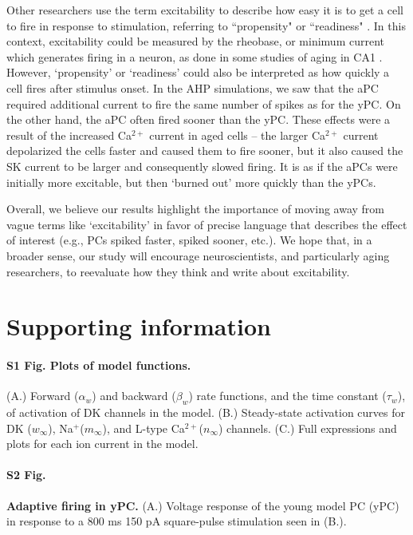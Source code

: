 \documentclass[10pt,letterpaper]{article}
\newcommand{\Ca}{Ca$^{2+}$}
\newcommand{\Na}{Na$^{+}$}
\begin{document}
Other researchers use the term excitability to describe how easy it is to get a cell to fire in response to stimulation, referring to ``propensity" \cite{daoudal2003long} or ``readiness" \cite{konstantinovic2019effects}. In this context, excitability could be measured by the rheobase, or minimum current which generates firing in a neuron, as done in some studies of aging in CA1 \cite{potier1993age}. However, `propensity' or `readiness' could also be interpreted as how quickly a cell fires after stimulus onset. In the AHP simulations, we saw that the aPC required additional current to fire the same number of spikes as for the yPC. On the other hand, the aPC often fired sooner than the yPC. These effects were a result of the increased {\Ca} current in aged cells -- the larger {\Ca} current depolarized the cells faster and caused them to fire sooner, but it also caused the SK current to be larger and consequently slowed firing. It is as if the aPCs were initially more excitable, but then `burned out' more quickly than the yPCs. 

Overall, we believe our results highlight the importance of moving away from vague terms like `excitability' in favor of precise language that describes the effect of interest (e.g., PCs spiked faster, spiked sooner, etc.). We hope that, in a broader sense, our study will encourage neuroscientists, and particularly aging researchers, to reevaluate how they think and write about excitability.

\section*{Supporting information}

\paragraph*{S1 Fig. Plots of model functions.} (A.) Forward ($\alpha_w$) and backward ($\beta_w$) rate functions, and the time constant ($\tau_w$), of activation of DK channels in the model. (B.) Steady-state activation curves for DK ($w_{\infty}$), \Na ($m_{\infty}$), and L-type \Ca ($n_{\infty}$) channels. (C.) Full expressions and plots for each ion current in the model.
\label{S1_Fig}

\paragraph*{S2 Fig.}
\label{S2_Fig}
{\bf Adaptive firing in yPC.} (A.) Voltage response of the young model PC (yPC) in response to a 800 ms 150 pA square-pulse stimulation seen in (B.).
\end{document}
